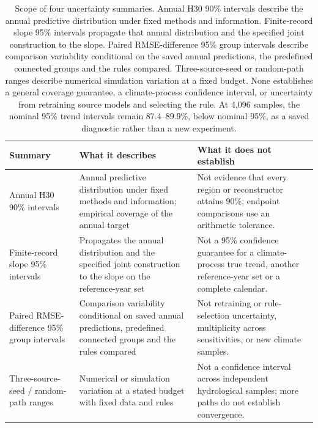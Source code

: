 \begin{table}[p]\centering\footnotesize
\caption{Scope of four uncertainty summaries. Annual H30 90\% intervals describe the annual predictive distribution under fixed methods and information. Finite-record slope 95\% intervals propagate that annual distribution and the specified joint construction to the slope. Paired RMSE-difference 95\% group intervals describe comparison variability conditional on the saved annual predictions, the predefined connected groups and the rules compared. Three-source-seed or random-path ranges describe numerical simulation variation at a fixed budget. None establishes a general coverage guarantee, a climate-process confidence interval, or uncertainty from retraining source models and selecting the rule. At 4,096 samples, the nominal 95\% trend intervals remain 87.4--89.9\%, below nominal 95\%, as a saved diagnostic rather than a new experiment.}
\label{tab:uncertainty-scope}
\begin{tabular}{>{\raggedright\arraybackslash}p{}>{\raggedright\arraybackslash}p{}>{\raggedright\arraybackslash}p{}}
\toprule
Summary & What it describes & What it does not establish \\
\midrule
Annual H30 90\% intervals & Annual predictive distribution under fixed methods and information; empirical coverage of the annual target & Not evidence that every region or reconstructor attains 90\%; endpoint comparisons use an arithmetic tolerance. \\
\addlinespace
Finite-record slope 95\% intervals & Propagates the annual distribution and the specified joint construction to the slope on the reference-year set & Not a 95\% confidence guarantee for a climate-process true trend, another reference-year set or a complete calendar. \\
\addlinespace
Paired RMSE-difference 95\% group intervals & Comparison variability conditional on saved annual predictions, predefined connected groups and the rules compared & Not retraining or rule-selection uncertainty, multiplicity across sensitivities, or new climate samples. \\
\addlinespace
Three-source-seed / random-path ranges & Numerical or simulation variation at a stated budget with fixed data and rules & Not a confidence interval across independent hydrological samples; more paths do not establish convergence. \\
\bottomrule
\end{tabular}
\end{table}
